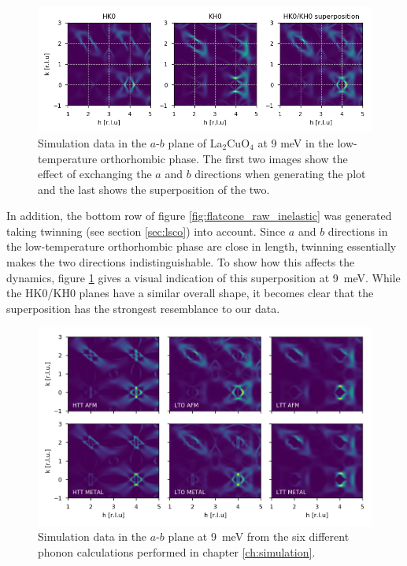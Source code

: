 \begin{figure}
    \centering
    \includegraphics[width=\textwidth]{fig/lowen/simulation_colorplot_twin_comparison.png}
    \caption[Simulation comparison hkl khl]{Simulation data in the $a$-$b$ plane of La$_2$CuO$_4$ at 9 meV in the low-temperature orthorhombic phase. The first two images show the effect of exchanging the $a$ and $b$ directions when generating the plot and the last shows the superposition of the two.}
    \label{fig:lto_hk0_kh0_comparison}
\end{figure}

In addition, the bottom row of figure \ref{fig:flatcone_raw_inelastic} was generated taking twinning (see section \ref{sec:lsco}) into account. Since $a$ and $b$ directions in the low-temperature orthorhombic phase are close in length, twinning essentially makes the two directions indistinguishable. To show how this affects the dynamics, figure \ref{fig:lto_hk0_kh0_comparison} gives a visual indication of this superposition at \SI{9}{\milli\eV}. While the HK0/KH0 planes have a similar overall shape, it becomes clear that the superposition has the strongest resemblance to our data.

\begin{figure}
    \centering
    \includegraphics[width=\textwidth]{fig/lowen/twinning_plots_all.png}
    \caption[All qxqy plots at 9 meV including twinning for the LTO case]{Simulation data in the $a$-$b$ plane at \SI{9}{\milli\eV} from the six different phonon calculations performed in chapter \ref{ch:simulation}.}
    \label{fig:simulation_sqw_xy_plots_all}
\end{figure}

